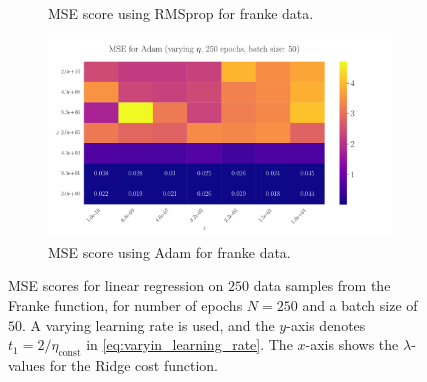 \documentclass[%
reprint,s
amsmath,amssymb,
aps,
]{revtex4-2}
\begin{document}
\begin{figure}
\begin{subfigure}{0.41\textwidth}
		\caption{MSE score using RMSprop for franke data.}
		\label{fig:LinReg25x25_epoch250_bacthS50_RMSprop}
	\end{subfigure}
	\hfill
	\begin{subfigure}{0.41\textwidth}
		\includegraphics[width=\textwidth]{Figures/LinRegAdam_250epochs_batchS50.pdf}
		\caption{MSE score using Adam for franke data.}
		\label{fig:LinReg25x25_epoch250_bacthS50_zoomed_Adam}
	\end{subfigure}
	\caption{MSE scores for linear regression on \(250\) data samples from the Franke function, for number of epochs \(N=250\) and a batch size of \(50\). A varying learning rate is used, and the \(y\)-axis denotes \(t_1 = 2/\eta_{\text{const}}\) in \eqref{eq:varyin_learning_rate}. The \(x\)-axis shows the \(\lambda\)-values for the Ridge cost function.}
	\label{fig:LinReg_250}
\end{figure}

\end{document}
